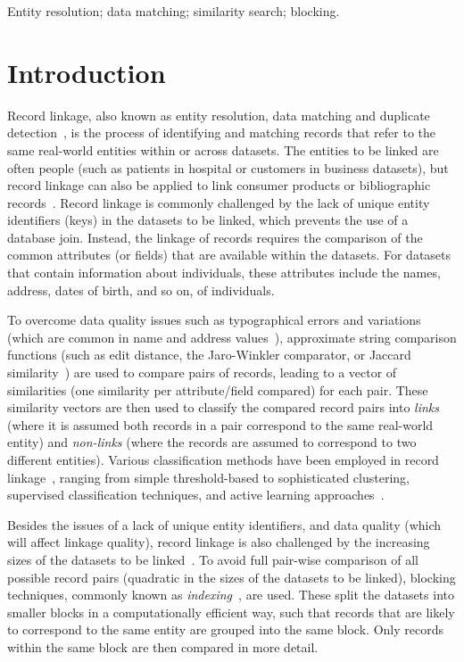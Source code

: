\documentclass{llncs}
\begin{document}
\keywords Entity resolution; data matching; similarity search;
         blocking.


\section{Introduction}
\label{sec-intro}

Record linkage, also known as entity resolution, data matching and
duplicate detection~\cite{Chr12}, is the process of identifying and
matching records that refer to the same real-world entities within or
across datasets. The entities to be linked are often people (such as
patients in hospital or customers in business datasets), but record
linkage can also be applied to link consumer products or bibliographic
records~\cite{Chr12}. Record linkage is commonly challenged by the lack
of unique entity identifiers (keys) in the datasets to be linked, which
prevents the use of a database join. Instead, the linkage of records
requires the comparison of the common attributes (or fields) that are
available within the datasets. For datasets that contain information
about individuals, these attributes include the names, address, dates of
birth, and so on, of individuals.

To overcome data quality issues such as typographical errors and
variations (which are common in name and address values~\cite{Chr12}),
approximate string comparison functions (such as edit distance, the
Jaro-Winkler comparator, or Jaccard similarity~\cite{Chr12}) are used to
compare pairs of records, leading to a vector of similarities (one
similarity per attribute/field compared) for each pair. These similarity
vectors are then used to classify the compared record pairs into
\emph{links} (where it is assumed both records in a pair correspond to
the same real-world entity) and \emph{non-links} (where the records are
assumed to correspond to two different entities). Various
classification methods have been employed in record
linkage~\cite{Chr12,Don15}, ranging from simple threshold-based to
sophisticated clustering, supervised classification techniques, and
active learning approaches~\cite{Wan15}.

Besides the issues of a lack of unique entity identifiers, and data
quality (which will affect linkage quality), record linkage is also
challenged by the increasing sizes of the datasets to be
linked~\cite{Don15}. To avoid full pair-wise comparison of all possible
record pairs (quadratic in the sizes of the datasets to be linked),
blocking techniques, commonly known as \emph{indexing}~\cite{Chr12b},
are used. These split the datasets into smaller blocks in a
computationally efficient way, such that records that are likely to
correspond to the same entity are grouped into the same block. Only
records within the same block are then compared in more detail.
\end{document}
